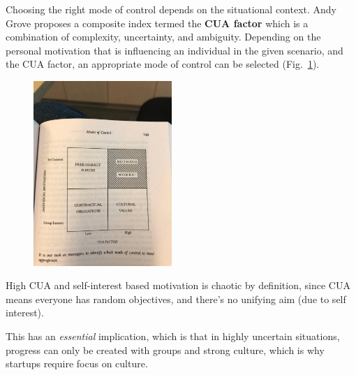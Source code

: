 \documentclass{article}
\begin{document}
Choosing the right mode of control depends on the situational context. Andy Grove proposes a composite index termed the \textbf{CUA factor} which is a combination of complexity, uncertainty, and ambiguity. Depending on the personal motivation that is influencing an individual in the given scenario, and the CUA factor, an appropriate mode of control can be selected (Fig.~\ref{fig:control}).

\begin{figure}[ht]
  \centering
  \includegraphics[height=7cm]{control.pdf}
  \caption{\label{fig:control} }
\end{figure}

High CUA and self-interest based motivation is chaotic by definition, since CUA means everyone has random objectives, and there’s no unifying aim (due to self interest).

This has an \textit{essential} implication, which is that in highly uncertain situations, progress can only be created with groups and strong culture, which is why startups require focus on culture.

{}

\end{document}
